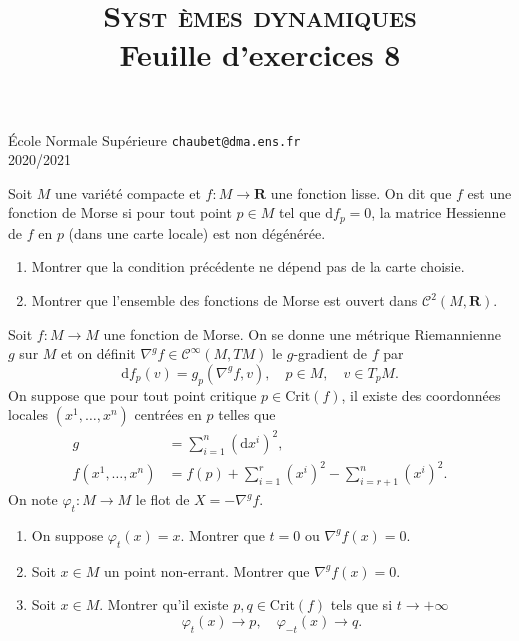 \documentclass[a4paper,10pt,openany]{article}
\title{\textsc{Syst \`emes dynamiques} \\ Feuille d'exercices 8}
\date{}
\author{}
\theoremstyle{plain}
\theoremstyle{definition}
\newcommand{\dd}{\mathrm{d}}
\newcommand{\R}{\mathbf{R}}
\begin{document}
{\noindent \'Ecole Normale Sup\'erieure  \hfill  \texttt{chaubet@dma.ens.fr} } \\
{2020/2021 \hfill}

{\let\newpage\relax\maketitle}
\maketitle
{} \vspace{1.5mm} 

\noindent Soit $M$ une vari\'et\'e compacte et $f : M \to \R$ une fonction lisse. On dit que $f$ est une fonction de Morse si pour tout point $p \in M$ tel que $\dd f_p = 0$, la matrice Hessienne de $f$ en $p$ (dans une carte locale) est non d\'eg\'en\'er\'ee.
\begin{enumerate}
\item Montrer que la condition pr\'ec\'edente ne d\'epend pas de la carte choisie.
\item Montrer que l'ensemble des fonctions de Morse est ouvert dans $\mathcal{C}^2(M, \R).$
\end{enumerate}
Soit $f : M \to M$ une fonction de Morse. On se donne une m\'etrique Riemannienne $g$ sur $M$ et on d\'efinit $\nabla^g f \in \mathcal{C}^\infty(M,TM)$ le $g$-gradient de $f$ par
$$
\dd f_p(v) = g_p(\nabla^g f, v), \quad p \in M, \quad v \in T_pM.
$$
On suppose que pour tout point critique $p \in \mathrm{Crit}(f)$, il existe des coordonn\'ees locales $(x^1, \dots, x^n)$ centr\'ees en $p$ telles que
$$
\begin{aligned}
g &= \sum_{i=1}^n (\dd x^i)^2, \\
f(x^1, \dots, x^n) &= f(p) + \sum_{i=1}^r (x^i)^2 - \sum_{i=r+1}^n (x^i)^2.
\end{aligned}
$$
On note $\varphi_t : M \to M$ le flot de $X = -\nabla^gf$.
\begin{enumerate}[resume]
\item On suppose $\varphi_t(x) = x$. Montrer que $t = 0$ ou $\nabla^gf (x) = 0$.
\item Soit $x \in M$ un point non-errant. Montrer que $\nabla^g f(x) = 0$.
\item Soit $x \in M$. Montrer qu'il existe $p,q \in \mathrm{Crit}(f)$ tels que si $t \to +\infty$
$$
\varphi_t(x) \to p, \quad \varphi_{-t}(x) \to q.
$$
\end{enumerate}
\end{document}
